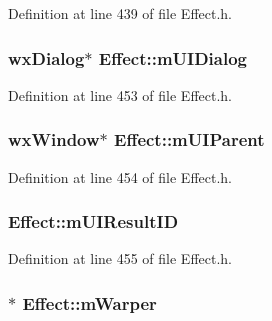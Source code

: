 Definition at line 439 of file Effect.\+h.

\subsubsection[{\texorpdfstring{m\+U\+I\+Dialog}{mUIDialog}}]{\setlength{\rightskip}{0pt plus 5cm}wx\+Dialog$\ast$ Effect\+::m\+U\+I\+Dialog\hspace{0.3cm}{\ttfamily [protected]}}\hypertarget{class_effect_a2b2400c5b452692ae17279406db85237}{}\label{class_effect_a2b2400c5b452692ae17279406db85237}


Definition at line 453 of file Effect.\+h.

\subsubsection[{\texorpdfstring{m\+U\+I\+Parent}{mUIParent}}]{\setlength{\rightskip}{0pt plus 5cm}wx\+Window$\ast$ Effect\+::m\+U\+I\+Parent\hspace{0.3cm}{\ttfamily [protected]}}\hypertarget{class_effect_a72092c469d5f0e82f16fbac57e38229f}{}\label{class_effect_a72092c469d5f0e82f16fbac57e38229f}


Definition at line 454 of file Effect.\+h.

\subsubsection[{\texorpdfstring{m\+U\+I\+Result\+ID}{mUIResultID}}]{ Effect\+::m\+U\+I\+Result\+ID\hspace{0.3cm}{\ttfamily [protected]}}\hypertarget{class_effect_ac044ccf3a2ad28f9859681d9ec36862f}{}\label{class_effect_ac044ccf3a2ad28f9859681d9ec36862f}


Definition at line 455 of file Effect.\+h.

\subsubsection[{\texorpdfstring{m\+Warper}{mWarper}}]{$\ast$ Effect\+::m\+Warper\hspace{0.3cm}{\ttfamily [protected]}}\hypertarget{class_effect_ad4f49243ec8c626ba3c5e9044d5fc531}{}\label{class_effect_ad4f49243ec8c626ba3c5e9044d5fc531}


